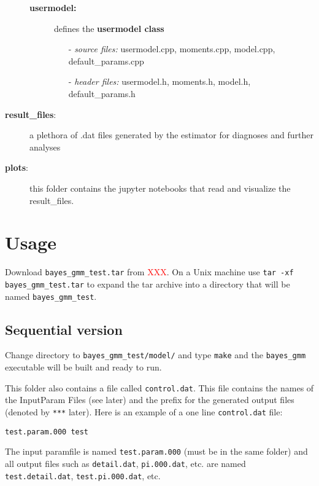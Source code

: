 \documentclass[11pt, letterpaper, notitlepage]{article}
\begin{document}
\begin{description}
\begin{description}
\item[\textbf{usermodel:}] defines the \textbf{usermodel class}
\begin{itemize}
\item[-] \emph{source files:} usermodel.cpp, moments.cpp, model.cpp, default\_params.cpp 
\item[-] \emph{header files:} usermodel.h, moments.h, model.h, default\_params.h
\end{itemize}
\end{description}
\item[\textbf{result\_files}:] a plethora of .dat files generated by the estimator for diagnoses and further analyses
\item[\textbf{plots}:] this folder contains the jupyter notebooks that read and visualize the result\_files.
\end{description}

\pagebreak

\section{Usage}

Download \texttt{bayes\_gmm\_test.tar} from \textcolor{red}{XXX}. On a Unix machine use \texttt{tar -xf bayes\_gmm\_test.tar} to expand the tar archive into a directory that will be named \texttt{bayes\_gmm\_test}.

\subsection{Sequential version}

Change directory to \texttt{bayes\_gmm\_test/model/} and type \texttt{make} and  the \texttt{bayes\_gmm} executable will be built and ready to run.

This folder also contains a file called \texttt{control.dat}. This file contains the names of the InputParam Files (see later) and the prefix for the generated output files (denoted by \texttt{***} later). Here is an example of a one line \texttt{control.dat} file:

\texttt{test.param.000 test}

The input paramfile is named \texttt{test.param.000} (must be in the same folder) and all output files such as \texttt{detail.dat},
\texttt{pi.000.dat}, etc. are named \texttt{test.detail.dat}, \texttt{test.pi.000.dat}, etc.
\end{document}
